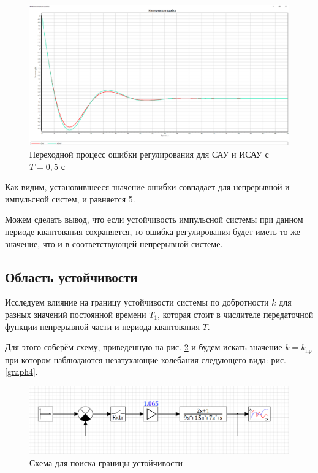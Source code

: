 	\begin{figure}
		\centering\includegraphics[width=.85\textwidth]{png/graph3.png}
		\caption{Переходной процесс ошибки регулирования для САУ и ИСАУ с $T=0,5$ с}
		\label{graph3}
	\end{figure}
	
	Как видим, установившееся значение ошибки совпадает для непрерывной и импульсной систем, и равняется 5. 
	
	Можем сделать вывод, что если устойчивость импульсной системы при данном периоде квантования сохраняется, то ошибка регулирования будет иметь то же значение, что и в соответствующей непрерывной системе.
	
	\subsection{Область устойчивости}
	
	Исследуем влияние на границу устойчивости системы по добротности $k$ для разных значений постоянной времени $T_1$, которая стоит в числителе передаточной функции непрерывной части и периода квантования $T$.
	
	Для этого соберём схему, приведенную на рис. \ref{scheme3} и будем искать значение $k=k_\text{пр}$ при котором наблюдаются незатухающие колебания следующего вида: рис. \ref{graph4}.
	
	\begin{figure}
		\centering\includegraphics[width=.7\textwidth]{png/scheme3.png}
		\caption{Схема для поиска границы устойчивости}
		\label{scheme3}
	\end{figure}
	
